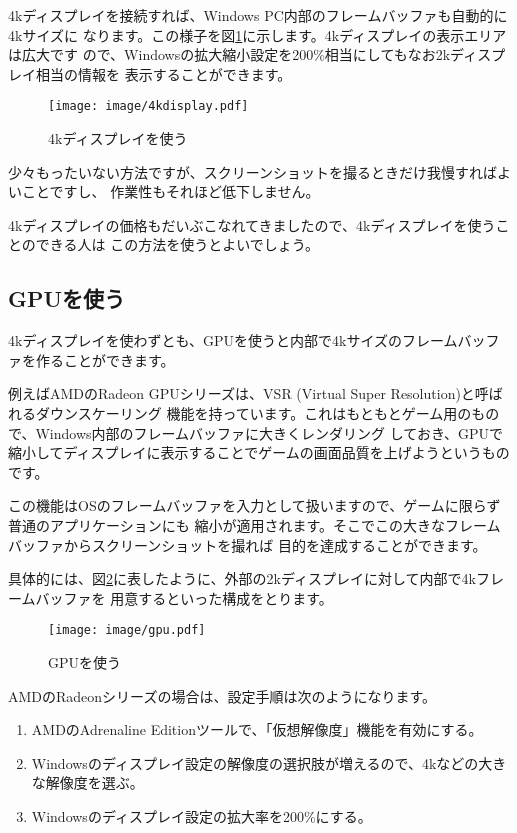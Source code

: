 4kディスプレイを接続すれば、Windows PC内部のフレームバッファも自動的に4kサイズに
なります。この様子を図\ref{fig:4k-display}に示します。4kディスプレイの表示エリアは広大です
ので、Windowsの拡大縮小設定を200\%相当にしてもなお2kディスプレイ相当の情報を
表示することができます。

\begin{figure}[btp]
  \begin{center}
    \texttt{[image: image/4kdisplay.pdf]}
    \caption{4kディスプレイを使う} \label{fig:4k-display}
  \end{center}
\end{figure}

少々もったいない方法ですが、スクリーンショットを撮るときだけ我慢すればよいことですし、
作業性もそれほど低下しません。

4kディスプレイの価格もだいぶこなれてきましたので、4kディスプレイを使うことのできる人は
この方法を使うとよいでしょう。

\subsection{GPUを使う}
4kディスプレイを使わずとも、GPUを使うと内部で4kサイズのフレームバッファを作ることができます。

例えばAMDのRadeon GPUシリーズは、VSR (Virtual Super Resolution)と呼ばれるダウンスケーリング
機能を持っています。これはもともとゲーム用のもので、Windows内部のフレームバッファに大きくレンダリング
しておき、GPUで縮小してディスプレイに表示することでゲームの画面品質を上げようというものです。

この機能はOSのフレームバッファを入力として扱いますので、ゲームに限らず普通のアプリケーションにも
縮小が適用されます。そこでこの大きなフレームバッファからスクリーンショットを撮れば
目的を達成することができます。

具体的には、図\ref{fig:gpu}に表したように、外部の2kディスプレイに対して内部で4kフレームバッファを
用意するといった構成をとります。

\begin{figure}[btp]
  \begin{center}
    \texttt{[image: image/gpu.pdf]}
    \caption{GPUを使う} \label{fig:gpu}
  \end{center}
\end{figure}

AMDのRadeonシリーズの場合は、設定手順は次のようになります。


\begin{enumerate}
  \item AMDのAdrenaline Editionツールで、「仮想解像度」機能を有効にする。
  \item Windowsのディスプレイ設定の解像度の選択肢が増えるので、4kなどの大きな解像度を選ぶ。
  \item Windowsのディスプレイ設定の拡大率を200\%にする。
\end{enumerate}

